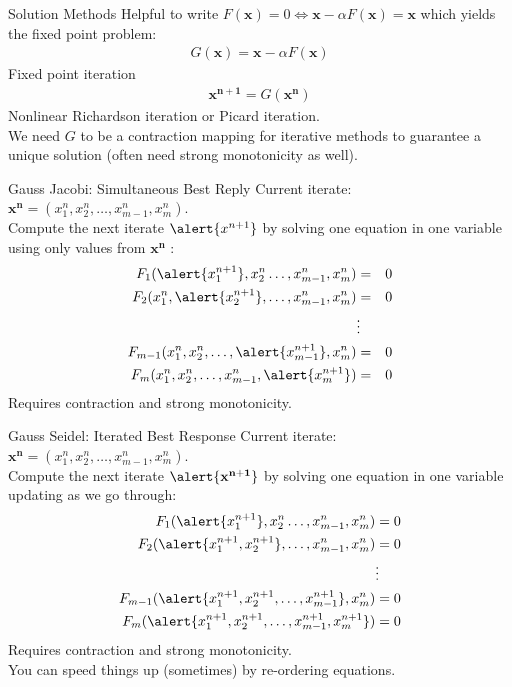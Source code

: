 \begin{frame}{Solution Methods}
Helpful to write $F(\mathbf{x}) = 0 \Leftrightarrow \mathbf{x} - \alpha F(\mathbf{x}) = \mathbf{x}$ which yields the fixed point problem:
\begin{eqnarray*}
G(\mathbf{x}) = \mathbf{x} -\alpha F(\mathbf{x})
\end{eqnarray*}
Fixed point iteration
\begin{eqnarray*}
\mathbf{x^{n+1}} = G(\mathbf{x^n})
\end{eqnarray*}
Nonlinear Richardson iteration or Picard iteration.\\
\vspace{0.5cm}
We need $G$ to be a \alert{contraction mapping} for iterative methods to guarantee a unique solution (often need strong monotonicity as well).
\end{frame} 

\begin{frame}{Gauss Jacobi: Simultaneous Best Reply}
Current iterate: $\mathbf{x^n} = (x_1^n,x_2^n,\ldots,x_{m-1}^n,x_m^n)$.\\
\vspace{0.5cm}
Compute the next iterate $\alert{x^{n+1}}$ by solving one equation in one variable using only values from $\mathbf{x^n}$ : 
\begin{eqnarray*}
F_1 (\alert{x_1^{n+1}},x_2^n \ldots, x_{m-1}^n, x_m^n)  &=& 0 \\
F_2  (x_1^n,\alert{x_2^{n+1}},\ldots,x_{m-1}^n,x_m^n)  &=& 0\\
&\vdots&\\ 
F_{m-1}  (x_1^n,x_2^n,\ldots,\alert{x_{m-1}^{n+1}},x_m^n)  &=& 0\\
F_m  (x_1^n,x_2^n,\ldots,x_{m-1}^n, \alert{x_m^{n+1}})  &=& 0
\end{eqnarray*}
Requires contraction and strong monotonicity.
\end{frame} 

\begin{frame}{Gauss Seidel: Iterated Best Response}
Current iterate: $\mathbf{x^n} = (x_1^n,x_2^n,\ldots,x_{m-1}^n,x_m^n)$.\\
\vspace{0.5cm}
Compute the next iterate $\alert{\mathbf{x^{n+1}}}$ by solving one equation in one variable updating as we go through:
\begin{align*}
F_1 (\alert{x_1^{n+1}},x_2^n \ldots, x_{m-1}^n, x_m^n)  &= 0 \\
F_2  (\alert{x_1^{n+1},x_2^{n+1}},\ldots,x_{m-1}^n,x_m^n)  &= 0\\
&\vdots\\ 
F_{m-1}  (\alert{x_1^{n+1},x_2^{n+1},\ldots,x_{m-1}^{n+1}},x_m^n)  &= 0\\
F_m (\alert{x_1^{n+1},x_2^{n+1},\ldots,x_{m-1}^{n+1}, x_m^{n+1}})  &= 0
\end{align*}
Requires contraction and strong monotonicity.\\
You can speed things up (sometimes) by re-ordering equations.

\end{frame} 

